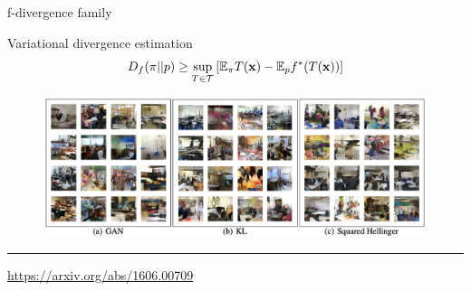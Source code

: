 \begin{frame}{f-divergence family}
	\begin{block}{Variational divergence estimation}
		\[
			D_f(\pi || p) \geq \sup_{T \in \mathcal{T}} \left[\mathbb{E}_{\pi}T(\mathbf{x}) -  \mathbb{E}_p f^*(T(\mathbf{x})) \right]
		\]
	\end{block}
	\begin{figure}
		\centering
		\includegraphics[width=1.0\linewidth]{figs/f_div_results}
	\end{figure}
	\vfill
	\hrule\medskip 
	{\scriptsize \href{https://arxiv.org/abs/1606.00709}{https://arxiv.org/abs/1606.00709}}
\end{frame}
